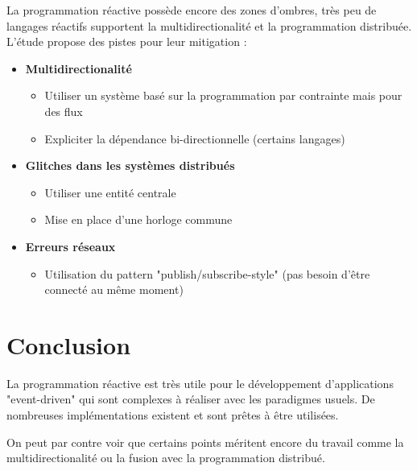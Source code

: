 \documentclass[10pt,final]{IEEEtran}
\begin{document}
La programmation réactive possède encore des zones d'ombres, très peu de langages réactifs
supportent la multidirectionalité et la programmation distribuée. L'étude propose des pistes pour leur mitigation :
\begin{itemize}
    \item \textbf{Multidirectionalité}
        \begin{itemize}
            \item Utiliser un système basé sur la programmation par contrainte mais pour des flux
            \item Expliciter la dépendance bi-directionnelle (certains langages)
        \end{itemize}
    \item \textbf{Glitches dans les systèmes distribués}
        \begin{itemize}
            \item Utiliser une entité centrale
            \item Mise en place d'une horloge commune
        \end{itemize}
    \item \textbf{Erreurs réseaux}
        \begin{itemize}
            \item Utilisation du pattern "publish/subscribe-style" (pas besoin d'être connecté au même moment)
        \end{itemize}
\end{itemize}

\section{Conclusion}

La programmation réactive est très utile pour le développement d'applications "event-driven" qui sont complexes à réaliser avec les paradigmes usuels. De nombreuses implémentations existent et sont prêtes à être utilisées.

On peut par contre voir que certains points méritent encore du travail comme la multidirectionalité ou la fusion avec la programmation distribué.
\end{document}
